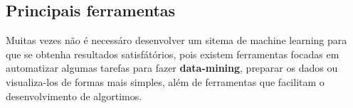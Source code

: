\subsection{Principais ferramentas}
\label{subsec:ferramentas}
Muitas vezes não é necessáro desenvolver um sitema de machine learning para que se obtenha resultados satisfátórios, pois existem
ferramentas focadas em automatizar algumas tarefas para fazer \textbf{data-mining}, preparar os dados ou visualiza-los de formas mais 
simples, além de ferramentas que facilitam o desenvolvimento de algortimos. 


  






    